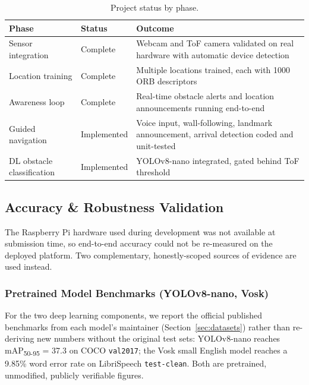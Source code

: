 \documentclass[12pt,a4paper]{article}
\begin{document}
\begin{table}[H]
\centering
\begin{tabularx}{\textwidth}{l l X}
\toprule
\textbf{Phase} & \textbf{Status} & \textbf{Outcome} \\
\midrule
Sensor integration & Complete & Webcam and ToF camera validated on real hardware with automatic device detection \\
Location training & Complete & Multiple locations trained, each with 1000\textendash5000 ORB descriptors \\
Awareness loop & Complete & Real-time obstacle alerts and location announcements running end-to-end \\
Guided navigation & Implemented & Voice input, wall-following, landmark announcement, arrival detection coded and unit-tested \\
DL obstacle classification & Implemented & YOLOv8-nano integrated, gated behind ToF threshold \\
\bottomrule
\end{tabularx}
\caption{Project status by phase.}
\end{table}

\subsection{Accuracy \& Robustness Validation}
\label{sec:accuracy}
The Raspberry Pi hardware used during development was not available at submission time, so end-to-end accuracy could not be re-measured on the deployed platform. Two complementary, honestly-scoped sources of evidence are used instead.

\subsubsection{Pretrained Model Benchmarks (YOLOv8-nano, Vosk)}
For the two deep learning components, we report the official published benchmarks from each model's maintainer (Section~\ref{sec:datasets}) rather than re-deriving new numbers without the original test sets: YOLOv8-nano reaches mAP\textsubscript{50-95} = 37.3 on COCO \texttt{val2017}; the Vosk small English model reaches a 9.85\% word error rate on LibriSpeech \texttt{test-clean}. Both are pretrained, unmodified, publicly verifiable figures.
\end{document}
